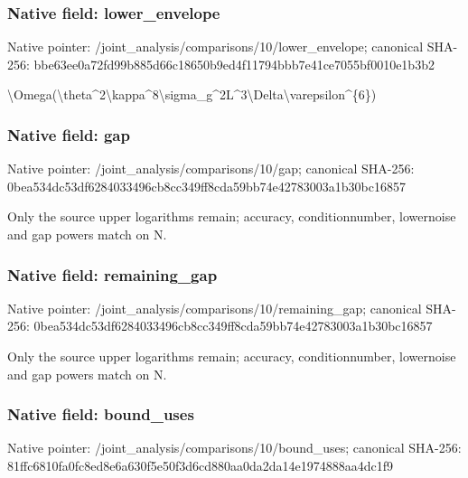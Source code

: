 \documentclass[10pt,a4paper]{article}
\begin{document}
\subsubsection{Native field: lower\_envelope}


Native pointer: /joint\_analysis/comparis\allowbreak{}ons/10/lower\_envelope; canonical SHA-256: bbe63ee0a72fd99b885d66c1\allowbreak{}8650b9ed4f11794bbb7e41ce\allowbreak{}7055bf0010e1b3b2


\textbackslash{}Omega(\textbackslash{}theta\textasciicircum{}2\textbackslash{}kappa\textasciicircum{}8\textbackslash{}\allowbreak{}sigma\_g\textasciicircum{}2L\textasciicircum{}3\textbackslash{}Delta\textbackslash{}varep\allowbreak{}silon\textasciicircum{}\{6\})


\subsubsection{Native field: gap}


Native pointer: /joint\_analysis/comparisons/10/gap; canonical SHA-256: 0bea534dc53df6284033496c\allowbreak{}b8cc349ff8cda59bb74e4278\allowbreak{}3003a1b30bc16857


Only the source upper logarithms remain; accuracy, conditionnumber, lowernoise and gap powers match on N.


\subsubsection{Native field: remaining\_gap}


Native pointer: /joint\_analysis/comparis\allowbreak{}ons/10/remaining\_gap; canonical SHA-256: 0bea534dc53df6284033496c\allowbreak{}b8cc349ff8cda59bb74e4278\allowbreak{}3003a1b30bc16857


Only the source upper logarithms remain; accuracy, conditionnumber, lowernoise and gap powers match on N.


\subsubsection{Native field: bound\_uses}


Native pointer: /joint\_analysis/comparis\allowbreak{}ons/10/bound\_uses; canonical SHA-256: 81ffc6810fa0fc8ed8e6a630\allowbreak{}f5e50f3d6cd880aa0da2da14\allowbreak{}e1974888aa4dc1f9
\end{document}
